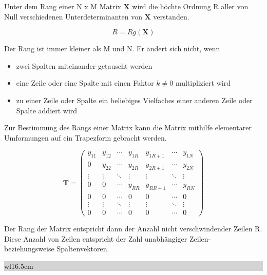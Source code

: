 \noindent Unter dem Rang einer N x M Matrix $\mathbf{X}$ wird die h\"{o}chte Ordnung R aller von Null verschiedenen Unterdeterminanten von $\mathbf{X}$ verstanden.

\begin{equation}\label{eq:thirteenonehundredfourteen}
R=Rg(\mathbf{X})
\end{equation}

\noindent Der Rang ist immer kleiner als M und N. Er \"{a}ndert sich nicht, wenn

\begin{itemize}
    \item zwei Spalten miteinander getauscht werden
    \item  eine Zeile oder eine Spalte mit einen Faktor  $k \neq 0$ multipliziert wird
    \item  zu einer Zeile oder Spalte ein beliebiges Vielfaches einer anderen Zeile oder Spalte addiert wird
\end{itemize}

\noindent Zur Bestimmung des Rangs einer Matrix kann die Matrix mithilfe elementarer Umformungen auf ein Trapezform gebracht werden.

\begin{equation}\label{eq:thirteenonehundredfifteen}
\mathbf{T}=\left(\begin{array}{ccccccc} {y_{11} } & {y_{12} } & {\cdots } & {y_{1R} } & {y_{1R+1} } & {\cdots } & {y_{1N} } \\ {0} & {y_{22} } & {\cdots } & {y_{2R} } & {y_{2R+1} } & {\cdots } & {y_{2N} } \\ {\vdots } & {\vdots } & {\ddots } & {\vdots } & {\vdots } & {\ddots } & {\vdots } \\ {0} & {0} & {\cdots } & {y_{RR} } & {y_{RR+1} } & {\cdots } & {y_{RN} } \\ {0} & {0} & {\cdots } & {0} & {0} & {\cdots } & {0} \\ {\vdots } & {\vdots } & {\ddots } & {\vdots } & {\vdots } & {\ddots } & {\vdots } \\ {0} & {0} & {\cdots } & {0} & {0} & {\cdots } & {0} \end{array}\right)
\end{equation}

\noindent Der Rang der Matrix entspricht dann der Anzahl nicht verschwindender Zeilen R. Diese Anzahl von Zeilen entspricht der Zahl unabh\"{a}ngiger Zeilen- beziehungsweise Spaltenvektoren.\bigskip

\noindent
\colorbox{lightgray}{%
%
\renewcommand\arraystretch{0.6}%
\begin{tabular}{ wl{16.5cm} }
{\selectfont
{}}
\end{tabular}%
}\medskip

